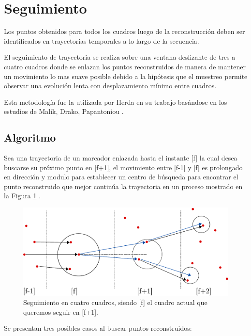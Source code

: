 \section{Seguimiento}

Los puntos obtenidos para todos los cuadros luego de la reconstrucción deben ser identificados en trayectorias temporales a lo largo de la secuencia.


El seguimiento de trayectoria se realiza sobre una ventana deslizante de tres a cuatro cuadros donde se enlazan los puntos reconstruidos de manera de mantener un movimiento lo mas suave posible debido a la hipótesis que el muestreo permite observar una evolución lenta con desplazamiento mínimo entre cuadros.


Esta metodología fue la utilizada por Herda \cite{herda} en su trabajo basándose en los estudios de Malik, Drako, Papantoniou \cite{griegos} .

\subsection{Algoritmo}

Sea una trayectoria de un marcador enlazada hasta el instante [f] la cual desea buscarse su próximo punto en [f+1], el movimiento entre [f-1] y [f] es prolongado en dirección y modulo para establecer un centro de búsqueda para encontrar el punto reconstruido que mejor continúa la trayectoria en un proceso mostrado en la Figura \ref{herda_00} .

\begin{figure}[ht!]
\begin{center}
\includegraphics[scale=0.8]{imagenes/Seguimiento/tracking-eps-converted-to.pdf}
\end{center}
\caption{Seguimiento en cuatro cuadros, siendo [f] el cuadro actual que queremos seguir en [f+1].}
\label{herda_00}
\end{figure}

Se presentan tres posibles casos al buscar puntos reconstruidos:


